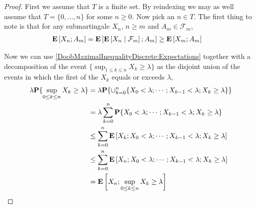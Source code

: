 \begin{proof}
First we assume that $T$ is a finite set.  By reindexing we may as
well assume that $T = \lbrace 0, \dotsc, n\rbrace$ for some $n \geq 0$.  Now pick an $n \in T$.
The first thing to note is that for any submartingale $X_n$, $n\geq m$ and $A_m
\in \mathcal{F}_m$,
\begin{align}\label{DoobMaximalInequalityDiscrete:Expectations}
\expectation{X_n ; A_m} &=
\expectation{\cexpectationlong{\mathcal{F}_m}{X_n} ; A_m}
\geq \expectation{X_m ; A_m}
\end{align}

Now we can use \eqref{DoobMaximalInequalityDiscrete:Expectations} together with a decomposition of the event $\lbrace \sup_{1 \leq k \leq n} X_k \geq \lambda \rbrace$
as the disjoint union of the events in which the first of the $X_k$ equals or exceeds $\lambda$,
\begin{align*}
\lambda \probability{\sup_{0 \leq k \leq n} X_k \geq \lambda} 
&=\lambda \probability{\cup_{k=0}^n \lbrace X_0 < \lambda; \dotsb;  X_{k-1} < \lambda; X_k \geq \lambda \rbrace } \\
&=\lambda \sum_{k=0}^n \probability{X_0 < \lambda; \dotsb;  X_{k-1} < \lambda; X_k \geq \lambda} \\
&\leq \sum_{k=0}^n \expectation{X_k ; X_0 < \lambda; \dotsb;  X_{k-1} < \lambda; X_k \geq \lambda} \\
&\leq \sum_{k=0}^n \expectation{X_n ; X_0 < \lambda; \dotsb;  X_{k-1} < \lambda; X_k \geq \lambda} \\
&= \expectation{X_n ;\sup_{0 \leq k \leq n} X_k \geq \lambda}
\end{align*}


\end{proof}
